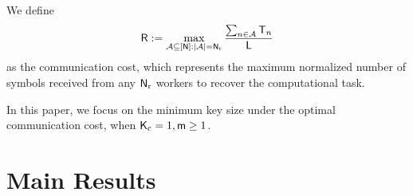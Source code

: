 \documentclass[conference,letterpaper]{IEEEtran}
\begin{document}
We define 
\begin{equation}
    {\sf R}: = \mathop {\max }\limits_{{\cal A} \subseteq [{\sf N}]:|{\cal A}| = {{\sf N}_{\rm r}}} \frac{{\sum\nolimits_{n \in {\cal A}} {{{\sf T}_n}} }}{{\sf L}}
\end{equation} 
as the communication cost, 
which represents the maximum normalized number of symbols received from any ${\sf N}_{\rm r}$ workers to recover the computational task.

In this paper, we focus on the minimum key size under the optimal communication cost, when ${\sf K}_{\rm c} = 1, {\sf m} \geq 1$.

\section{Main Results}
\label{sec:main}

\end{document}

